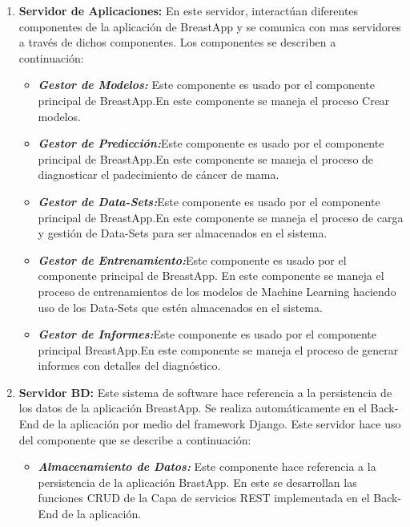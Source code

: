 \begin{enumerate}[label=\textbf{\arabic*})]
\item  \textbf{Servidor de Aplicaciones:} En este servidor, interactúan diferentes componentes de la aplicación de BreastApp y se comunica con mas servidores a través de dichos componentes. Los componentes se describen a continuación:

\begin{itemize}
\item  \textbf{\textit{Gestor de Modelos:}} Este componente es usado por el componente principal de BreastApp.En este componente se maneja el proceso Crear modelos.
		
\item  \textbf{\textit{Gestor de Predicción:}}Este componente es usado por el componente principal de BreastApp.En este componente se maneja el proceso de diagnosticar el padecimiento de cáncer de mama.
			
\item  \textbf{\textit{Gestor de Data-Sets:}}Este componente es usado por el componente principal de BreastApp.En este componente se maneja el proceso de carga  y gestión de Data-Sets para ser almacenados en el sistema.
				
\item  \textbf{\textit{Gestor de Entrenamiento:}}Este componente es usado por el componente principal de BreastApp. En este componente se maneja el proceso de entrenamientos de los modelos de Machine Learning haciendo uso de los Data-Sets  que estén almacenados en el sistema.
					
\item  \textbf{\textit{Gestor de Informes:}}Este componente es usado por el componente principal BreastApp.En este componente se maneja el proceso de generar informes con detalles del diagnóstico.				
\end{itemize}

\item  \textbf{Servidor BD:}  Este sistema de software hace referencia a la persistencia de los datos de la aplicación BreastApp. Se realiza  automáticamente en el Back-End de la aplicación por medio del framework Django. Este servidor hace uso del componente que se describe a continuación:
\begin{itemize}
	\item  \textbf{\textit{Almacenamiento de Datos:}} Este componente hace referencia a la persistencia de la aplicación BrastApp. En este se desarrollan las funciones CRUD de la Capa de servicios REST implementada en el Back-End de la aplicación.
\end{itemize}

\end{enumerate}

